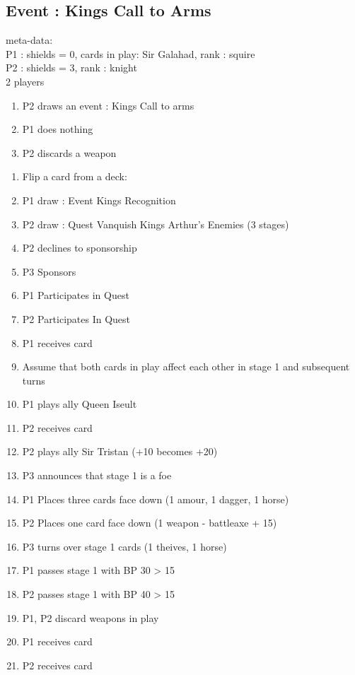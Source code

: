 \documentclass[a4paper,11pt]{article}
\begin{document}
\subsection{Event : Kings Call to Arms}
meta-data:\\
P1 : shields = 0, cards in play: Sir Galahad, rank : squire\\
P2 : shields = 3, rank : knight\\
2 players\\
\begin{enumerate}
	\item P2 draws an event : Kings Call to arms 
	\item P1 does nothing
	\item P2 discards a weapon 
\end{enumerate}

\begin{enumerate}
\item Flip a card from a deck: 
\item P1 draw : Event Kings Recognition 
\item P2 draw : Quest Vanquish Kings Arthur's Enemies (3 stages)
\item P2 declines to sponsorship
\item P3 Sponsors 
\item P1 Participates in Quest
\item P2 Participates In Quest
\item P1 receives card
\item Assume that both cards in play affect each other in stage 1 and subsequent turns
\item P1 plays ally Queen Iseult 
\item P2 receives card
\item P2 plays ally Sir Tristan (+10 becomes +20)
\item P3 announces that stage 1 is a foe
\item P1 Places three cards face down (1 amour, 1 dagger, 1 horse) 
\item P2 Places one card face down (1 weapon - battleaxe + 15)
\item P3 turns over stage 1 cards (1 theives, 1 horse)
\item P1 passes stage 1 with BP 30 > 15
\item P2 passes stage 1 with BP 40 > 15
\item P1, P2 discard weapons in play
\item P1 receives card
\item P2 receives card

\end{enumerate}
\end{document}
